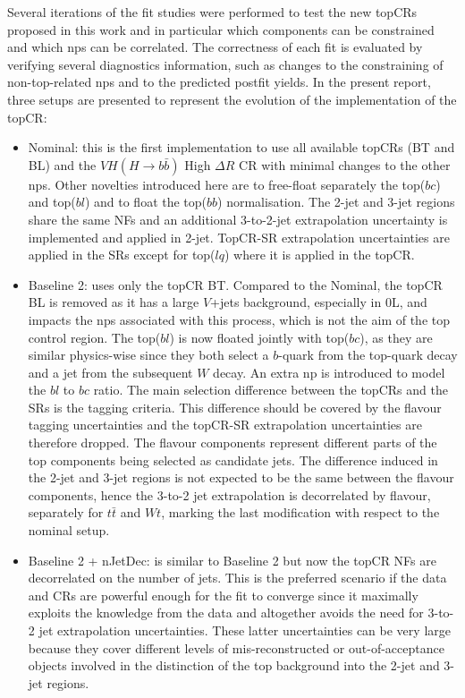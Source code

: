 Several iterations of the fit studies were performed to test the new topCRs proposed in this work and in particular which components can be constrained and which \gls{np}s can be correlated. The correctness of each fit is evaluated by verifying several diagnostics information, such as changes to the constraining of non-top-related \gls{np}s and to the predicted postfit yields. In the present report, three setups are presented to represent the evolution of the implementation of the topCR:
\begin{itemize}
\item Nominal: this is the first implementation to use all available topCRs (BT and BL) and the $VH(H\rightarrow b\bar{b})$ High $\Delta R$ CR with minimal changes to the other \gls{np}s. Other novelties introduced here are to free-float separately the top($bc$) and top($bl$) and to float the top($bb$) normalisation. The 2-jet and 3-jet regions share the same NFs and an additional 3-to-2-jet extrapolation uncertainty is implemented and applied in 2-jet. TopCR-SR extrapolation uncertainties are applied in the SRs except for top($lq$) where it is applied in the topCR. 
\item Baseline 2: uses only the topCR BT. Compared to the Nominal, the topCR BL is removed as it has a large $V$+jets background, especially in 0L, and impacts the \gls{np}s associated with this process, which is not the aim of the top control region. The top($bl$) is now floated jointly with top($bc$), as they are similar physics-wise since they both select a $b$-quark from the top-quark decay and a jet from the subsequent $W$ decay. An extra \gls{np} is introduced to model the $bl$ to $bc$ ratio. The main selection difference between the topCRs and the SRs is the tagging criteria. This difference should be covered by the flavour tagging uncertainties and the topCR-SR extrapolation uncertainties are therefore dropped. The flavour components represent different parts of the top components being selected as candidate jets. The difference induced in the 2-jet and 3-jet regions is not expected to be the same between the flavour components, hence the 3-to-2 jet extrapolation is decorrelated by flavour, separately for $t\bar{t}$ and $Wt$, marking the last modification with respect to the nominal setup.
\item Baseline 2 + nJetDec: is similar to Baseline 2 but now the topCR NFs are decorrelated on the number of jets. This is the preferred scenario if the data and CRs are powerful enough for the fit to converge since it maximally exploits the knowledge from the data and altogether avoids the need for 3-to-2 jet extrapolation uncertainties. These latter uncertainties can be very large because they cover different levels of mis-reconstructed or out-of-acceptance objects involved in the distinction of the top background into the 2-jet and 3-jet regions.
\end{itemize}

